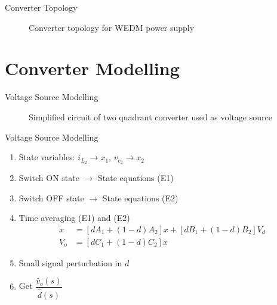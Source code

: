 \documentclass[10pt]{beamer}
\begin{document}
\begin{frame}{Converter Topology}
  \begin{figure}
    \centering
    
    \caption{Converter topology for WEDM power supply \cite{tastekin2009novel}}
    \label{fig:working-3}
  \end{figure}
\end{frame}

\section{Converter Modelling}

\begin{frame}{Voltage Source Modelling}
  \begin{figure}
    \centering
    
    \caption{Simplified circuit of two quadrant converter used as voltage source}
    \label{fig:working-4}
  \end{figure}

\end{frame}

\begin{frame}{Voltage Source Modelling}
\begin{enumerate}
\item State variables: $i_{L_2} \rightarrow x_1$, $v_{c_2} \rightarrow x_2$
\item Switch ON state $\rightarrow$ State equations (E1)
\item Switch OFF state $\rightarrow$ State equations (E2)
\item Time averaging (E1) and (E2)
  \begin{equation}
    \begin{split}
      \dot{x} &= [dA_1+(1-d)A_2]x + [dB_1 + (1-d)B_2]V_d\\
      V_o &= [dC_1+(1-d)C_2]x
    \end{split}
    \label{eq:mod14}
  \end{equation}
\item Small signal perturbation in $d$
\item Get $\dfrac{\hat{v}_o(s)}{\hat{d}(s)}$
\end{enumerate}
\end{frame}
\end{document}
